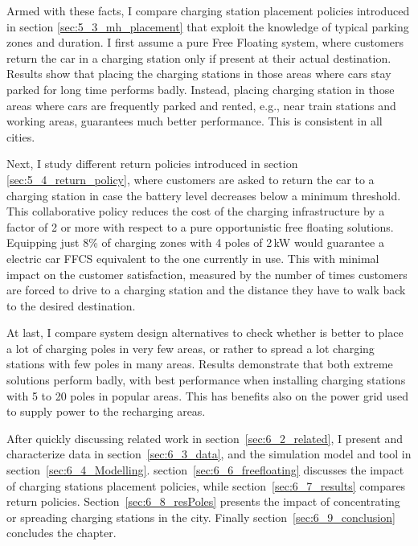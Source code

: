 Armed with these facts, I compare charging station placement policies introduced in section \ref{sec:5_3_mh_placement} that exploit the knowledge of typical parking zones and duration. I first assume a pure Free Floating system, where customers return the car in a charging station only if present at their actual destination.
Results show that placing the charging stations in those areas where cars stay parked for long time performs badly. Instead, placing charging station in those areas where cars are frequently parked and rented, e.g., near train stations and working areas, guarantees much better performance. This is consistent in all cities.

Next, I study different return policies introduced in section \ref{sec:5_4_return_policy}, where customers are asked to return the car to a charging station in case the battery level decreases below a minimum threshold. This collaborative policy reduces the cost of the charging infrastructure by a factor of 2 or more with respect to a pure opportunistic free floating solutions. Equipping just 8\% of charging zones with 4 poles of 2\,kW would guarantee a electric car FFCS equivalent to the one currently in use.
This with minimal impact on the customer satisfaction, measured by the number of times customers are forced to drive to a charging station and the distance they have to walk back to the desired destination.

At last, I compare system design alternatives to check whether is better to place a lot of charging poles in very few areas, or rather to spread a lot charging stations with few poles in many areas. Results demonstrate that both extreme solutions perform badly, with best performance when installing charging stations with  5 to 20 poles in popular areas. This has benefits also on the power grid used to supply power to the recharging areas.


After quickly discussing related work in section~\ref{sec:6_2_related}, I present and characterize data in section~\ref{sec:6_3_data}, and the simulation model and tool in section~\ref{sec:6_4_Modelling}. section~\ref{sec:6_6_freefloating} discusses the impact of charging stations placement policies, while section~\ref{sec:6_7_results} compares return policies. Section~\ref{sec:6_8_resPoles} presents the impact of concentrating or spreading charging stations in the city. Finally section~\ref{sec:6_9_conclusion} concludes the chapter.

